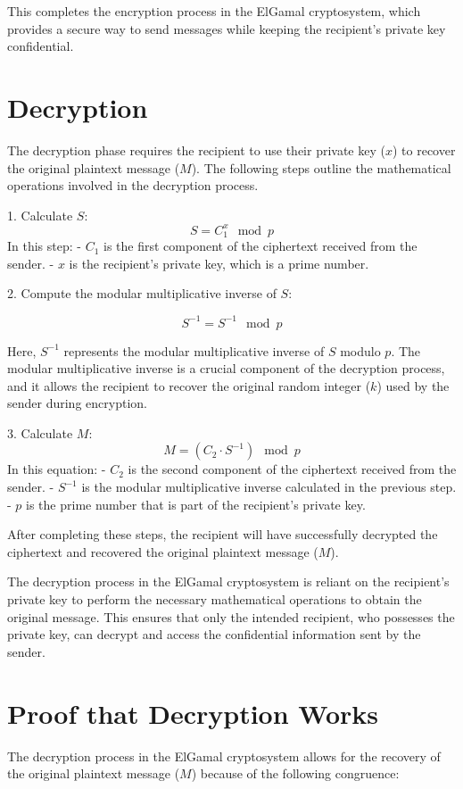 \documentclass{article}
\begin{document}
This completes the encryption process in the ElGamal cryptosystem, which provides a secure way to send messages while keeping the recipient's private key confidential.

\section*{Decryption}
The decryption phase requires the recipient to use their private key ($x$) to recover the original plaintext message ($M$). The following steps outline the mathematical operations involved in the decryption process.

1. Calculate $S$:
\[
S = C_1^x \mod p
\]
In this step:
- $C_1$ is the first component of the ciphertext received from the sender.
- $x$ is the recipient's private key, which is a prime number.

2. Compute the modular multiplicative inverse of $S$:

\[S^{-1} = S^{-1} \mod p\]


Here, $S^{-1}$ represents the modular multiplicative inverse of $S$ modulo $p$. The modular multiplicative inverse is a crucial component of the decryption process, and it allows the recipient to recover the original random integer ($k$) used by the sender during encryption.

3. Calculate $M$:
\[
M = (C_2 \cdot S^{-1}) \mod p
\]
In this equation:
- $C_2$ is the second component of the ciphertext received from the sender.
- $S^{-1}$ is the modular multiplicative inverse calculated in the previous step.
- $p$ is the prime number that is part of the recipient's private key.

After completing these steps, the recipient will have successfully decrypted the ciphertext and recovered the original plaintext message ($M$).

The decryption process in the ElGamal cryptosystem is reliant on the recipient's private key to perform the necessary mathematical operations to obtain the original message. This ensures that only the intended recipient, who possesses the private key, can decrypt and access the confidential information sent by the sender.

\section*{Proof that Decryption Works}

The decryption process in the ElGamal cryptosystem allows for the recovery of the original plaintext message ($M$) because of the following congruence:
\end{document}
